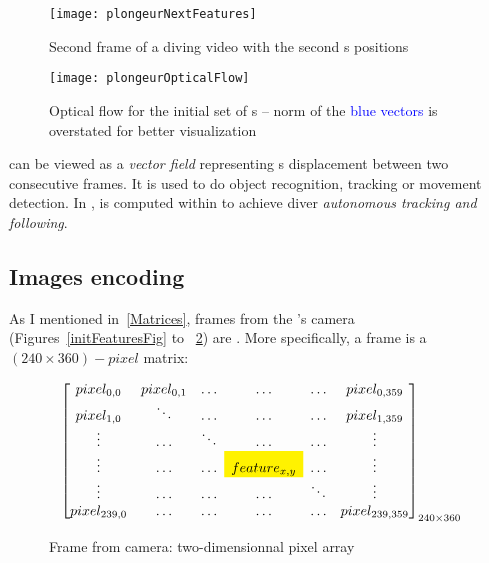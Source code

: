 \begin{figure}[!htbp]
	\centering
	\texttt{[image: plongeurNextFeatures]}
	\caption{Second frame of a diving video with the second \feat{}s positions}
	\label{secondFeaturesFig}
\end{figure}
\FloatBarrier



\begin{figure}[!htbp]
	\centering
	\texttt{[image: plongeurOpticalFlow]}
	\caption{Optical flow for the initial set of \feat{}s -- \small{norm of the \textcolor{blue}{blue vectors} is overstated for better visualization}}
	\label{opticalFlowFig}
\end{figure}
\FloatBarrier

\flow{} can be viewed as a \emph{vector field} representing \feat{}s displacement between two consecutive frames. It is used to do object recognition, tracking or movement detection. In \iBubble, \flow{} is computed within  to achieve diver \emph{autonomous tracking and following}.\par


\subsection{Images encoding}

As I mentioned in~\ref{Matrices}, frames from the \rasp's camera (Figures~\ref{initFeaturesFig} to ~\ref{opticalFlowFig}) are . More specifically, a frame is a $(240\times 360)-pixel$ matrix:

\begin{figure}[!htbp]
\[
\begin{bmatrix}

pixel_{0,0} & pixel_{0,1} & \ldots & \ldots & \ldots & pixel_{0,359}\\

pixel_{1,0} & \ddots & \ldots & \ldots & \ldots & pixel_{1,359}\\

\vdots & \ldots & \ddots & \ldots & \ldots & \vdots\\

\vdots & \ldots & \ldots & \cellcolor{yellow}{feature_{x,y}} & \ldots & \vdots\\

\vdots & \ldots & \ldots & \ldots & \ddots & \vdots\\

pixel_{239,0} & \ldots & \ldots  & \ldots & \ldots & pixel_{239,359}

\end{bmatrix}_{240\times 360}
\]
\caption{Frame from camera: two-dimensionnal pixel array}
\label{frameFig}
\end{figure}
\FloatBarrier

